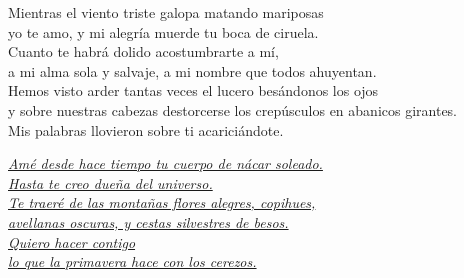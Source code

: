 \begin{flushright}
    Mientras el viento triste galopa matando mariposas \\
yo te amo, y mi alegría muerde tu boca de ciruela. \\
Cuanto te habrá dolido acostumbrarte a mí, \\
a mi alma sola y salvaje, a mi nombre que todos ahuyentan. \\
Hemos visto arder tantas veces el lucero besándonos los ojos \\
y sobre nuestras cabezas destorcerse los crepúsculos en abanicos girantes. \\
Mis palabras llovieron sobre ti acariciándote. \\
\end{flushright}
\textit{\underline{Amé desde hace tiempo tu cuerpo de nácar soleado. } \\ \underline{
Hasta te creo dueña del universo. } \\ \underline{
Te traeré de las montañas flores alegres, copihues, } \\ \underline{
avellanas oscuras, y cestas silvestres de besos. } \\ \underline{
Quiero hacer contigo } \\ \underline{
lo que la primavera hace con los cerezos. }}